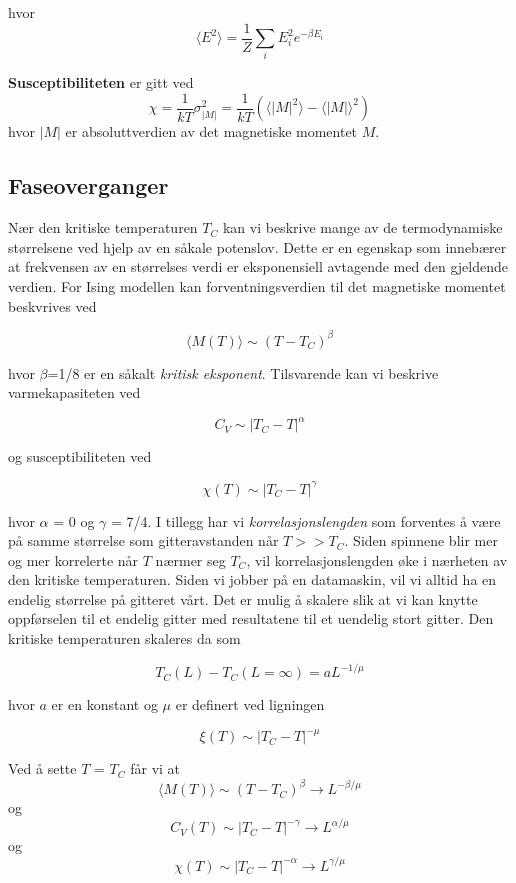 \documentclass[11pt,a4paper]{article}
\begin{document}
hvor 
\begin{equation}
\langle E^2 \rangle = \frac{1}{Z} \sum_i E_i^2 e^{- \beta E_i}
\end{equation}

\textbf{Susceptibiliteten} er gitt ved
\begin{equation}
\chi = \frac{1}{kT} \sigma_{|M|}^2 = \frac{1}{kT}( \langle |M|^2 \rangle - \langle |M| \rangle^2 )
\end{equation}
hvor $|M |$ er absoluttverdien av det magnetiske momentet $M$.

\subsection{Faseoverganger}
Nær den kritiske temperaturen $T_C$ kan vi beskrive mange av de termodynamiske størrelsene ved hjelp av en såkale potenslov. Dette er en egenskap som innebærer at frekvensen av en størrelses verdi er eksponensiell avtagende med den gjeldende verdien. For Ising modellen kan forventningsverdien til det magnetiske momentet beskvrives ved

\[ \langle M(T) \rangle \sim (T - T_C)^\beta \]

hvor $\beta$=1/8 er en såkalt \textit{kritisk eksponent}. Tilsvarende kan vi beskrive varmekapasiteten ved

\[ C_V \sim |T_C - T|^\alpha \]

og susceptibiliteten ved

\[ \chi(T) \sim |T_C - T|^\gamma  \]

hvor $\alpha$ = 0 og $\gamma$ = 7/4. I tillegg har vi \textit{korrelasjonslengden} som forventes å være på samme størrelse som gitteravstanden når $T >> T_C$. Siden spinnene blir mer og mer korrelerte når $T$ nærmer seg $T_C$, vil korrelasjonslengden øke i nærheten av den kritiske temperaturen. Siden vi jobber på en datamaskin, vil vi alltid ha en endelig størrelse på gitteret vårt. Det er mulig å skalere slik at vi kan knytte oppførselen til  et endelig gitter med resultatene til et uendelig stort gitter. Den kritiske temperaturen skaleres da som

\[T_C(L) - T_C(L=\infty ) = aL^{-1/\mu}  \]

hvor $a$ er en konstant og $\mu$ er definert ved ligningen

\[\xi (T) \sim |T_C - T|^{-\mu} \]

Ved å sette $T$ = $T_C$ får vi at
\[ \langle M(T) \rangle \sim (T-T_C)^\beta \rightarrow L^{-\beta/\mu} \]
og
\[C_V(T) \sim |T_C-T|^{-\gamma} \rightarrow L^{\alpha/\mu} \]
og
\[ \chi (T) \sim |T_C - T|^{-\alpha} \rightarrow L^{\gamma / \mu } \]
\end{document}
